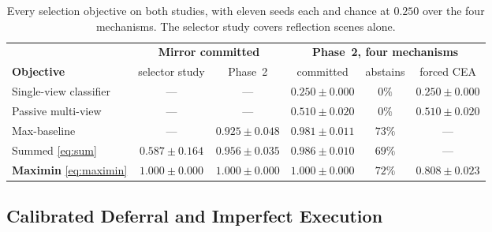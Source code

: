 \documentclass{article} %
\theoremstyle{defstyle}
\theoremstyle{plain}
\begin{document}
\begin{table}[htb]
\caption{Every selection objective on both studies, with eleven seeds each and chance at $0.250$ over the four mechanisms. The selector study covers reflection scenes alone.}
\label{tab:phase2}
\begin{center}
\footnotesize \setlength{\tabcolsep}{4.5pt}
\begin{tabular}{lccccc}
\toprule
& \multicolumn{2}{c}{\textbf{Mirror committed}} &
\multicolumn{3}{c}{\textbf{Phase~2, four mechanisms}} \\
\cmidrule(lr){2-3}\cmidrule(lr){4-6}
\textbf{Objective} & selector study & Phase~2 & committed & abstains & forced CEA \\
\midrule
Single-view classifier & --- & --- & $0.250{\pm}0.000$ & $0\%$ & $0.250{\pm}0.000$ \\
Passive multi-view     & --- & --- & $0.510{\pm}0.020$ & $0\%$ & $0.510{\pm}0.020$ \\
Max-baseline           & --- & $0.925{\pm}0.048$ & $0.981{\pm}0.011$ & $73\%$ & --- \\
Summed \eqref{eq:sum}  & $0.587{\pm}0.164$ & $0.956{\pm}0.035$ & $0.986{\pm}0.010$ & $69\%$ & --- \\
\textbf{Maximin} \eqref{eq:maximin} & $\mathbf{1.000{\pm}0.000}$ & $\mathbf{1.000{\pm}0.000}$ & $\mathbf{1.000{\pm}0.000}$ & $72\%$ & $\mathbf{0.808{\pm}0.023}$ \\
\bottomrule
\end{tabular}
\end{center}
\end{table}

\subsection{Calibrated Deferral and Imperfect Execution}
\label{sec:supp-noise}
\end{document}
